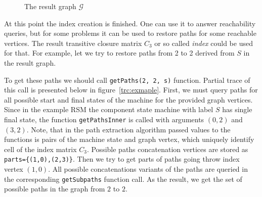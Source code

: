 \begin{figure}[h]
    \centering         
    \caption{The result graph $\mathcal{G}$}
    \label{fig:example_result}    
\end{figure}


At this point the index creation is finished. 
One can use it to answer reachability queries, but for some problems it can be used 
to restore paths for some reachable vertices. The result transitive closure matrix
$C_3$ or so called \textit{index} could be used for that. For example, let we try to
restore paths from 2 to 2 derived from $S$ in the result graph.

To get these paths we should call \verb|getPaths(2, 2, s)| function.
Partial trace of this call is presented below in figure~\ref{trc:exmaple}. 
First, we must query paths for all possible start and final states of the 
machine for the provided graph vertices. Since in the example RSM the component 
state machine with label $S$ has single final state, the function 
\verb|getPathsInner| is called with arguments $(0,2)$ and $(3,2)$.
Note, that in the path extraction algorithm passed values to the functions is 
pairs of the machine state and graph vertex, which uniquely identify cell of 
the index matrix $C_3$. Possible paths concatenation vertices are stored as \verb|parts={(1,0),(2,3)}|. Then we try to get parts of paths going throw 
index vertex $(1,0)$. All possible concatenations variants of the paths are 
queried in the corresponding \verb|getSubpaths| function call. As the result,
we get the set of possible paths in the graph from $2$ to $2$.

